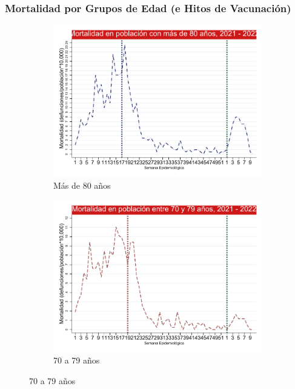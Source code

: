 \documentclass[xcolor=table]{beamer}
\begin{document}
\begin{frame}
		\frametitle{Mortalidad por Grupos de Edad (e Hitos de Vacunación)}
	\vspace{.5cm}
\begin{figure}
	\centering
	\begin{subfigure}[b]{0.3\textwidth}
		\centering
		\includegraphics[width=\textwidth]{../figuras/mortalidad_edad_80.pdf}
		\caption{Más de 80 años}
	\end{subfigure}
	\hfill
	\begin{subfigure}[b]{0.3\textwidth}
		\centering
		\includegraphics[width=\textwidth]{../figuras/mortalidad_edad_70.pdf}
		\caption{70 a 79 años}
	\end{subfigure}
	\hfill

\end{figure}
\end{frame}
\end{document}
